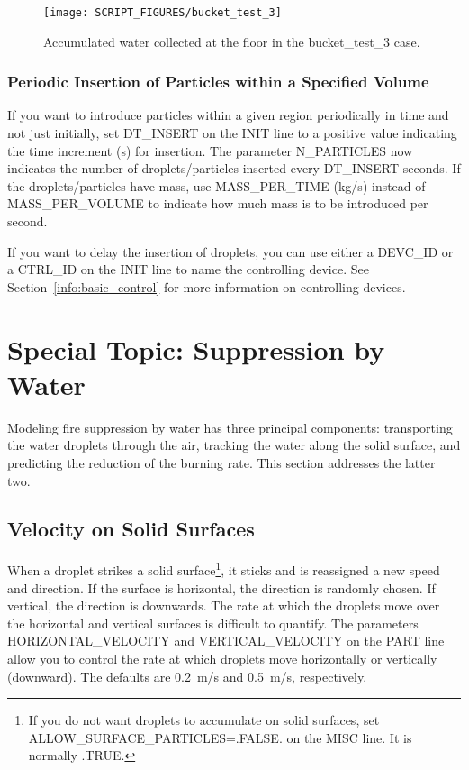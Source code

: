 \documentclass[11pt]{book}
\begin{document}
\begin{figure}[ht]
\centering
\texttt{[image: SCRIPT\_FIGURES/bucket\_test\_3]}
\caption[Results of the {\ct bucket\_test\_3} case]{Accumulated water collected at the floor in the {\ct bucket\_test\_3} case.}
\label{bucket_test_3_fig}
\end{figure}

\subsubsection{Periodic Insertion of Particles within a Specified Volume}

If you want to introduce particles within a given region periodically in time and not just initially, set {\ct DT\_INSERT} on the {\ct INIT} line to a positive value indicating the time increment (s) for insertion. The parameter {\ct N\_PARTICLES} now indicates the number of droplets/particles inserted every {\ct DT\_INSERT} seconds. If the droplets/particles have mass, use {\ct MASS\_PER\_TIME} (kg/s) instead of {\ct MASS\_PER\_VOLUME} to indicate how much mass is to be introduced per second.

If you want to delay the insertion of droplets, you can use either a {\ct DEVC\_ID} or a {\ct CTRL\_ID} on the {\ct INIT} line to name the controlling device. See Section~\ref{info:basic_control} for more information on controlling devices.



\section{Special Topic: Suppression by Water}
\label{info:suppression}

Modeling fire suppression by water has three principal components: transporting the water droplets through the air, tracking the water along the solid surface, and predicting the reduction of the burning rate. This section addresses the latter two.


\subsection{Velocity on Solid Surfaces}
\label{info:surface_droplets}

When a droplet strikes a solid surface\footnote{If you do not want droplets to accumulate on solid surfaces, set {\ct ALLOW\_SURFACE\_PARTICLES=.FALSE.} on the {\ct MISC} line. It is normally {\ct .TRUE.}}, it sticks and is reassigned a new speed and direction. If the surface is horizontal, the direction is randomly chosen. If vertical, the direction is downwards. The rate at which the droplets move over the horizontal and vertical surfaces is difficult to quantify. The parameters {\ct HORIZONTAL\_VELOCITY} and {\ct VERTICAL\_VELOCITY} on the {\ct PART} line allow you to control the rate at which droplets move horizontally or vertically (downward). The defaults are 0.2~m/s and 0.5~m/s, respectively.
\end{document}
